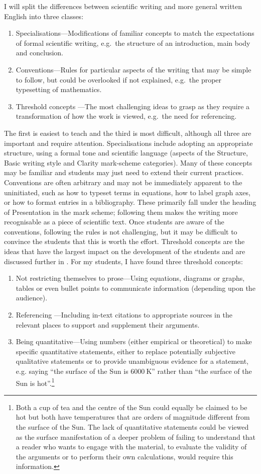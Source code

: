 I will split the differences between scientific writing and more general written English into three classes:
\begin{enumerate}
\item Specialisations---Modifications of familiar concepts to match the expectations of formal scientific writing, e.g.\ the structure of an introduction, main body and conclusion.
\item Conventions---Rules for particular aspects of the writing that may be simple to follow, but could be overlooked if not explained, e.g.\ the proper typesetting of mathematics.
\item Threshold concepts \citep{Meyer2003}---The most challenging ideas to grasp as they require a transformation of how the work is viewed, e.g.\ the need for referencing.
\end{enumerate}
The first is easiest to teach and the third is most difficult, although all three are important and require attention. Specialisations include adopting an appropriate structure, using a formal tone and scientific language (aspects of the Structure, Basic writing style and Clarity mark-scheme categories). Many of these concepts may be familiar and students may just need to extend their current practices. Conventions are often arbitrary and may not be immediately apparent to the uninitiated, such as how to typeset terms in equations, how to label graph axes, or how to format entries in a bibliography. These primarily fall under the heading of Presentation in the mark scheme; following them makes the writing more recognisable as a piece of scientific text. Once students are aware of the conventions, following the rules is not challenging, but it may be difficult to convince the students that this is worth the effort. Threshold concepts are the ideas that have the largest impact on the development of the students and are discussed further in . For my students, I have found three threshold concepts:
\begin{enumerate}
\item Not restricting themselves to prose---Using equations, diagrams or graphs, tables or even bullet points to communicate information (depending upon the audience).
\item Referencing \citep{Warner2011}---Including in-text citations to appropriate sources in the relevant places to support and supplement their arguments.
\item Being quantitative---Using numbers (either empirical or theoretical) to make specific quantitative statements, either to replace potentially subjective qualitative statements or to provide unambiguous evidence for a statement, e.g. saying ``the surface of the Sun is $6000~\mathrm{K}$'' rather than ``the surface of the Sun is hot''.\footnote{Both a cup of tea and the centre of the Sun could equally be claimed to be hot but both have temperatures that are orders of magnitude different from the surface of the Sun. The lack of quantitative statements could be viewed as the surface manifestation of a deeper problem of failing to understand that a reader who wants to engage with the material, to evaluate the validity of the arguments or to perform their own calculations, would require this information.}
\end{enumerate}
